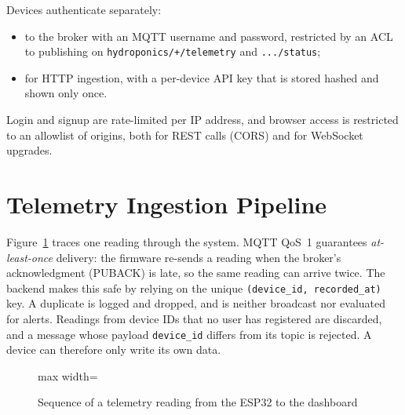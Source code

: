 \documentclass[11pt,a4paper,oneside]{report}
\newcommand{\code}[1]{\texttt{#1}}
\begin{document}
Devices authenticate separately:
\begin{itemize}
  \item to the broker with an MQTT username and password, restricted by an ACL to
        publishing on \code{hydroponics/+/telemetry} and \code{.../status};
  \item for HTTP ingestion, with a per-device API key that is stored hashed and shown
        only once.
\end{itemize}
Login and signup are rate-limited per IP address, and browser access is restricted to an
allowlist of origins, both for REST calls (CORS) and for WebSocket upgrades.

\section{Telemetry Ingestion Pipeline}
Figure~\ref{fig:seq} traces one reading through the system. MQTT QoS~1 guarantees
\emph{at-least-once} delivery: the firmware re-sends a reading when the broker's
acknowledgment (PUBACK) is late, so the same reading can arrive twice. The backend
makes this safe by relying on the unique \code{(device\_id, recorded\_at)} key. A
duplicate is logged and dropped, and is neither broadcast nor evaluated for alerts.
Readings from device IDs that no user has registered are discarded, and a message whose
payload \code{device\_id} differs from its topic is rejected. A device can therefore
only write its own data.

\begin{figure}[htbp]
\centering
\begin{adjustbox}{max width=\linewidth}
\end{adjustbox}
\caption{Sequence of a telemetry reading from the ESP32 to the dashboard}
\label{fig:seq}
\end{figure}
\end{document}
